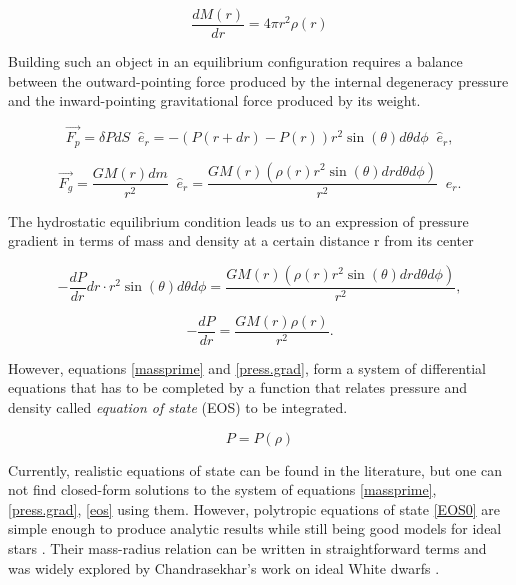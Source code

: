 \begin{equation}\label{massprime}
\frac{dM(r)}{dr} = 4\pi r^2 \rho(r) 
\end{equation}

Building such an object in an equilibrium configuration requires a balance between the outward-pointing force produced by the internal degeneracy pressure and the inward-pointing gravitational force produced by its weight. 

\begin{equation}\label{grav.f}
\vec{F_p} = \delta P dS\;\; \hat{e}_r = - \left(P(r+dr) - P(r) \right)  r^2 \sin (\theta) d\theta d\phi \;\; \hat{e}_r, 
\end{equation}

\begin{equation}\label{press.f}
\vec{F_g} = \frac{G M(r) dm}{r^2} \;\; \hat{e}_r = \frac{G M(r) (\rho(r) r^2 \sin(\theta) dr d\theta d\phi)}{r^2} \;\; \hat{e}_r.
\end{equation}

The hydrostatic equilibrium condition leads us to an expression of pressure gradient in terms of mass and density at a certain distance r from its center

\begin{equation}
-\frac{dP}{dr} dr \cdot r^2 \sin(\theta) d\theta d\phi = \frac{G M(r) (\rho(r) r^2 \sin(\theta) dr d\theta d\phi)}{r^2},
\end{equation}


\begin{equation}\label{press.grad}
-\frac{dP}{dr} = \frac{G M(r) \rho(r)}{r^2}. 
\end{equation}

However, equations \ref{massprime} and \ref{press.grad}, form a system of differential equations that has to be completed by a function that relates pressure and density called \textit{equation of state} (EOS) to be integrated.

\begin{equation}\label{eos}
P = P(\rho)
\end{equation}

Currently, realistic equations of state \cite{Banik_2014,Steiner:2012rk,PhysRevD.79.124032} can be found in the literature, but one can not find closed-form solutions to the system of equations \ref{massprime}, \ref{press.grad}, \ref{eos} using them. However, polytropic equations of state \ref{EOS0} are simple enough to produce analytic results while still being good models for ideal stars \cite{Chandrasekhar:1931ih}. Their mass-radius relation can be written in straightforward terms and was widely explored by Chandrasekhar's work on ideal White dwarfs \cite{Shapiro:1983du,Chandrasekhar:1931ih, camenzind}. 

